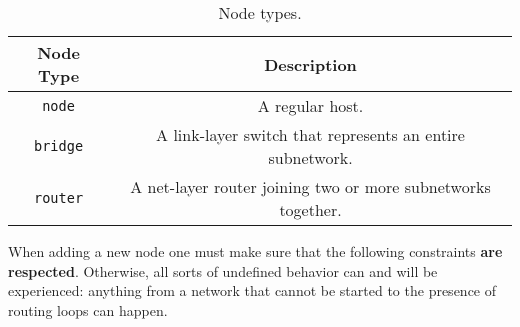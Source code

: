                \begin{table}
                    \centering
                    \begin{tabular}{|c|c|}
                        \hline
                        \textbf{Node Type} & \textbf{Description}\\
                        \hline
                        \texttt{node} & A regular host.\\
                        \hline
                        \texttt{bridge} & A link-layer switch that represents an entire subnetwork.\\
                        \hline
                        \texttt{router} & A net-layer router joining two or more subnetworks together.\\
                        \hline
                    \end{tabular}
                    \caption{Node types.}
                    \label{tab:node-types}
                \end{table}

                When adding a new node one must make sure that the following constraints \textbf{are respected}. Otherwise, all sorts of undefined behavior can and will be experienced: anything from a network that cannot be started to the presence of routing loops can happen.\\

